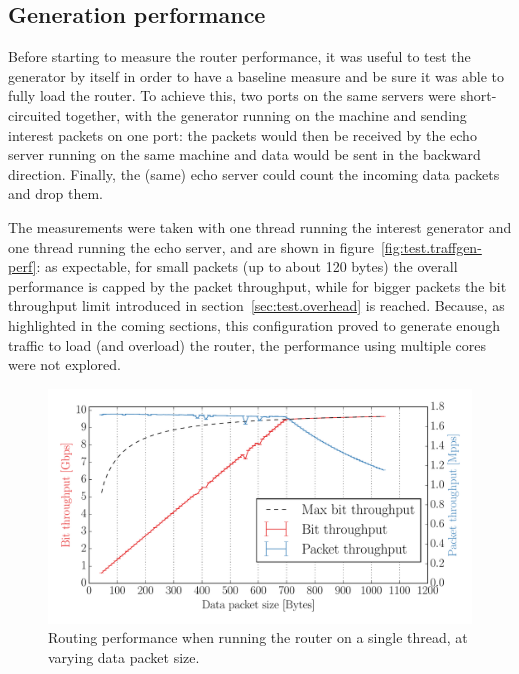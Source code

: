 \documentclass[11pt,a4paper,twoside,titlepage,openany]{book}
\begin{document}
\subsection{Generation performance}
Before starting to measure the router performance, it was useful to test the generator by itself in order to have a baseline measure and be sure it was able to fully load the router.
To achieve this, two ports on the same servers were short-circuited together, with the generator running on the machine and sending interest packets on one port: the packets would then be received by the echo server running on the same machine and data would be sent in the backward direction. Finally, the (same) echo server could count the incoming data packets and drop them.

The measurements were taken with one thread running the interest generator and one thread running the echo server, and are shown in figure~\ref{fig:test.traffgen-perf}: as expectable, for small packets (up to about 120 bytes) the overall performance is capped by the packet throughput, while for bigger packets the bit throughput limit introduced in section~\ref{sec:test.overhead} is reached.
Because, as highlighted in the coming sections, this configuration proved to generate enough traffic to load (and overload) the router, the performance using multiple cores were not explored.

\begin{figure}[tb]
  \begin{center}
    \includegraphics[width=1.0\textwidth]{img/augustus_increasing_len_0x1.pdf}
    \caption[Single-threaded routing performance at varying data packet size]{Routing performance when running the router on a single thread, at varying data packet size.}
    \label{fig:test.incr_len_single}
  \end{center}
\end{figure}
\end{document}
